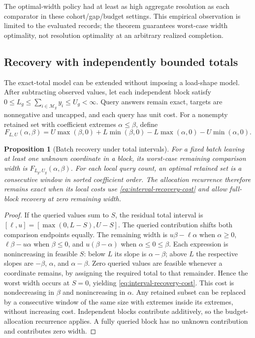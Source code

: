 \documentclass[12pt]{article}
\newtheorem{proposition}{Proposition}
\newcommand{\M}{\mathcal{M}}
\begin{document}
The optimal-width policy had at least as high aggregate resolution as
each comparator in these cohort/gap/budget settings. This empirical
observation is limited to the evaluated records; the theorem guarantees
worst-case width optimality, not resolution optimality at an arbitrary
realized completion.

\subsection{Recovery with independently bounded totals}\label{app:interval-theory}\label{sec:interval-recovery}
The exact-total model can be extended without imposing a load-shape model.
After subtracting observed values, let each independent block satisfy
$0\leq L_g\leq\sum_{i\in\M_g}y_i\leq U_g<\infty$.
Query answers remain exact, targets are nonnegative and uncapped, and
each query has unit cost. For a nonempty retained set with coefficient
extremes $\alpha\leq\beta$, define
\begin{equation}
 F_{L,U}(\alpha,\beta)=
 U\max(\beta,0)+L\min(\beta,0)
 -L\max(\alpha,0)-U\min(\alpha,0).
 \label{eq:interval-recovery-cost}
\end{equation}
\begin{proposition}[Batch recovery under total intervals]
For a fixed batch leaving at least one unknown coordinate in a block,
its worst-case remaining comparison width is
$F_{L_g,U_g}(\alpha,\beta)$. For each local query count, an optimal
retained set is a consecutive window in sorted coefficient order.
The allocation recurrence therefore remains exact when its local costs
use \eqref{eq:interval-recovery-cost} and allow full-block recovery at
zero remaining width.
\end{proposition}
\begin{proof}
If the queried values sum to $S$, the residual total interval is
$[\ell,u]=[\max(0,L-S),U-S]$. The queried contribution shifts both
comparison endpoints equally. The remaining width is $u\beta-\ell\alpha$
when $\alpha\geq0$, $\ell\beta-u\alpha$ when $\beta\leq0$, and
$u(\beta-\alpha)$ when $\alpha\leq0\leq\beta$. Each expression is
nonincreasing in feasible $S$: below $L$ its slope is
$\alpha-\beta$; above $L$ the respective slopes are $-\beta$,
$\alpha$, and $\alpha-\beta$. Zero queried values are feasible whenever
a coordinate remains, by assigning the required total to that remainder.
Hence the worst width occurs at $S=0$, yielding
\eqref{eq:interval-recovery-cost}. This cost is nondecreasing in
$\beta$ and nonincreasing in $\alpha$. Any retained subset can be
replaced by a consecutive window of the same size with extremes inside
its extremes, without increasing cost. Independent blocks contribute
additively, so the budget-allocation recurrence applies. A fully queried
block has no unknown contribution and contributes zero width.
\end{proof}
\end{document}
